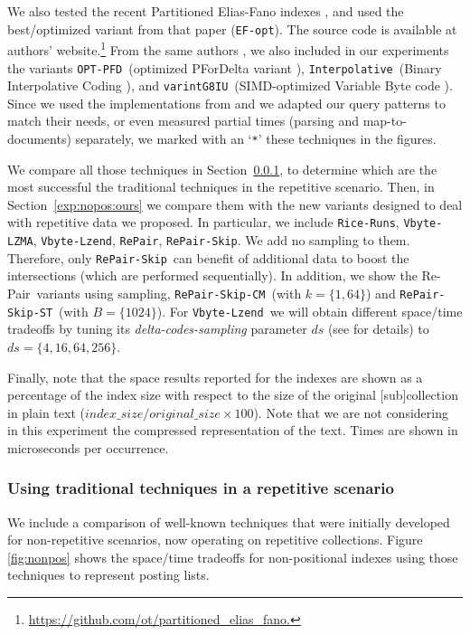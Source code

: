 \documentclass[review]{elsarticle}
\newcommand{\repair}{Re-Pair}
\newcommand{\riceRuns}{\texttt{Rice-Runs}}
\newcommand{\repairNo}{\texttt{RePair}}
\newcommand{\repairSkip}{\texttt{RePair-Skip}}
\newcommand{\repairSkipCM}{\texttt{RePair-Skip-CM}}
\newcommand{\repairSkipST}{\texttt{RePair-Skip-ST}}
\newcommand{\vbyteLZMA}{\texttt{Vbyte-LZMA}}
\newcommand{\vbyteLzend}{\texttt{Vbyte-Lzend}}
\newcommand{\interpolative}{\texttt{Interpolative}}
\newcommand{\efopt}{\texttt{EF-opt}}
\newcommand{\optpfd}{\texttt{OPT-PFD}}
\newcommand{\varint}{\texttt{varintG8IU}}
\begin{document}
We also tested the recent Partitioned Elias-Fano indexes \cite{OV14}, and used the best/optimized variant from that paper (\efopt). The source code is available at authors' website.\footnote{\url{https://github.com/ot/partitioned_elias_fano.}}
From  the same authors \cite{OV14}, we also included in our experiments the variants \optpfd\ (optimized PForDelta variant \cite{YDS09}), \interpolative\ (Binary Interpolative Coding \cite{MS00}), and \varint\ (SIMD-optimized Variable Byte code \cite{Stepanov:2011}). Since we used the implementations from \cite{OV14} and we adapted our query patterns to match their needs, or even measured partial times (parsing and map-to-documents) separately, we marked with an `\texttt{*}' these techniques in the figures. 



We compare all those techniques in Section~\ref{exp:nopos:others}, to determine which are the most successful the traditional techniques  in the repetitive scenario. 
Then, in Section~\ref{exp:nopos:ours} we compare them with the new variants designed to deal with repetitive data we proposed. In particular, we include \riceRuns,
\vbyteLZMA,  \vbyteLzend, \repairNo, \repairSkip. We add no sampling to them. Therefore, only \repairSkip\ can benefit of additional data to boost the intersections (which are performed sequentially). In addition, we show the \repair\ variants using sampling, \repairSkipCM\ (with $k=\{1,64\}$) and \repairSkipST\ (with $B=\{ 1024\}$). For \vbyteLzend\ we will obtain different space/time tradeoffs by tuning its {\em delta-codes-sampling} parameter $ds$ (see \cite{KNtcs12} for details) to $ds=\{4,16,64,256\}$.

Finally, note that the space results reported for the indexes are shown as a percentage 
of the index size with respect to the size of the original [sub]collection in plain text
($index\_size / original\_size \times 100$). Note that we are not considering in
this experiment the compressed representation of the text. 
Times are shown in microseconds per occurrence.



\subsubsection{Using traditional techniques in a repetitive scenario} \label{exp:nopos:others}

We include a comparison of well-known techniques that were initially developed
for non-repetitive scenarios, now operating on repetitive collections.
Figure \ref{fig:nonpos} shows the space/time tradeoffs for 
non-positional indexes using those techniques to represent posting lists. 
\end{document}
